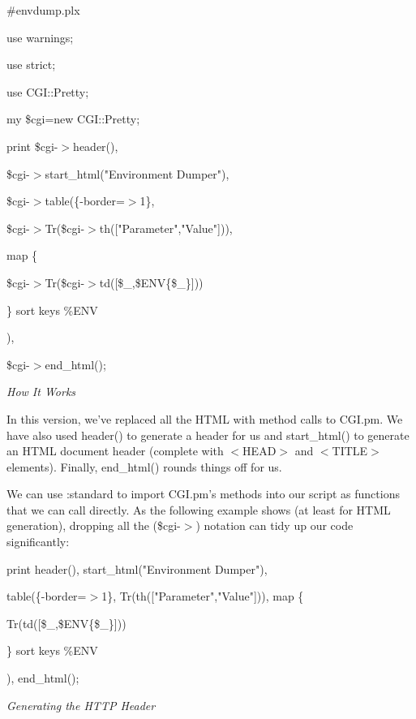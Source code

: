 \documentclass[a4paper,11pt]{book}
\begin{document}
\noindent \#envdump.plx

\noindent use warnings;

\noindent use strict;

\noindent use CGI::Pretty;

\noindent 

\noindent my \$cgi=new CGI::Pretty;

\noindent 

\noindent 

\noindent print \$cgi-$>$header(),

\noindent \$cgi-$>$start\_html("Environment Dumper"),

\noindent \$cgi-$>$table(\{-border=$>$1\},

\noindent \$cgi-$>$Tr(\$cgi-$>$th(["Parameter","Value"])),

\noindent map \{

\noindent \$cgi-$>$Tr(\$cgi-$>$td([\$\_,\$ENV\{\$\_\}]))

\noindent \} sort keys \%ENV

\noindent ),

\noindent \$cgi-$>$end\_html();

\noindent 

\noindent \textit{How It Works}

\noindent In this version, we've replaced all the HTML with method calls to CGI.pm. We have also used header() to generate a header for us and start\_html() to generate an HTML document header (complete with $<$HEAD$>$ and $<$TITLE$>$ elements). Finally, end\_html() rounds things off for us.

\noindent 

\noindent We can use :standard to import CGI.pm's methods into our script as functions that we can call directly. As the following example shows (at least for HTML generation), dropping all the (\$cgi-$>$) notation can tidy up our code significantly:

\noindent 

\noindent print header(), start\_html("Environment Dumper"),

\noindent table(\{-border=$>$1\}, Tr(th(["Parameter","Value"])), map \{

\noindent Tr(td([\$\_,\$ENV\{\$\_\}]))

\noindent \} sort keys \%ENV

), end\_html();

\noindent 

\noindent \textit{Generating the HTTP Header}
\end{document}

